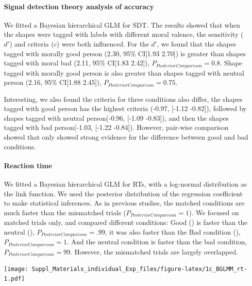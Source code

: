 \documentclass[
  english,
  man]{apa6}
\let\oldparagraph\paragraph
\renewcommand{\paragraph}[1]{\oldparagraph{#1}\mbox{}}
\begin{document}
\hypertarget{signal-detection-theory-analysis-of-accuracy-1}{%
\paragraph{Signal detection theory analysis of accuracy}\label{signal-detection-theory-analysis-of-accuracy-1}}

We fitted a Bayesian hierarchical GLM for SDT. The results showed that when the shapes were tagged with labels with different moral valence, the sensitivity (\(d'\)) and criteria (\(c\)) were both influenced. For the \(d'\), we found that the shapes tagged with morally good person (2.30, 95\% CI{[}1.93 2.70{]}) is greater than shapes tagged with moral bad (2.11, 95\% CI{[}1.83 2.42{]}), \(P_{PosteriorComparison} = 0.8\). Shape tagged with morally good person is also greater than shapes tagged with neutral person (2.16, 95\% CI{[}1.88 2.45{]}), \(P_{PosteriorComparison} = 0.75\).

Interesting, we also found the criteria for three conditions also differ, the shapes tagged with good person has the highest criteria (-0.97, {[}-1.12 -0.82{]}), followed by shapes tagged with neutral person(-0.96, {[}-1.09 -0.83{]}), and then the shapes tagged with bad person(-1.03, {[}-1.22 -0.84{]}). However, pair-wise comparison showed that only showed strong evidence for the difference between good and bad conditions.

\hypertarget{reaction-time-2}{%
\paragraph{Reaction time}\label{reaction-time-2}}

We fitted a Bayesian hierarchical GLM for RTs, with a log-normal distribution as the link function. We used the posterior distribution of the regression coefficient to make statistical inferences. As in previous studies, the matched conditions are much faster than the mismatched trials (\(P_{PosteriorComparison} = 1\)). We focused on matched trials only, and compared different conditions: Good () is faster than the neutral (), \(P_{PosteriorComparison} = .99\), it was also faster than the Bad condition (), \(P_{PosteriorComparison} = 1\). And the neutral condition is faster than the bad condition, \(P_{PosteriorComparison} = 99\). However, the mismatched trials are largely overlapped.

\texttt{[image: Suppl\_Materials\_individual\_Exp\_files/figure-latex/1c\_BGLMM\_rt-1.pdf]}
\end{document}
